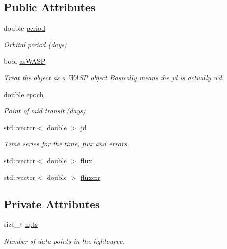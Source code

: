 \subsection*{Public Attributes}
\begin{DoxyCompactItemize}
\item 
double \hyperlink{classLightcurve_a6e8ac482decf1bbcc3f4eea9a4818646}{period}
\begin{DoxyCompactList}\small\item\em Orbital period (days) \item\end{DoxyCompactList}\item 
bool \hyperlink{classLightcurve_a54903f9ec0b5fc7b8080cacc332752ec}{asWASP}
\begin{DoxyCompactList}\small\item\em Treat the object as a WASP object Basically means the jd is actually wd. \item\end{DoxyCompactList}\item 
double \hyperlink{classLightcurve_aeb03d82f5ff13e75bbb40af674f6597a}{epoch}
\begin{DoxyCompactList}\small\item\em Point of mid transit (days) \item\end{DoxyCompactList}\item 
std::vector$<$ double $>$ \hyperlink{classLightcurve_a5bc412c5176599f90b4ae2fba5bd5f19}{jd}
\begin{DoxyCompactList}\small\item\em Time series for the time, flux and errors. \item\end{DoxyCompactList}\item 
std::vector$<$ double $>$ \hyperlink{classLightcurve_a88801eb8e66a51a2e15fad1aa42f7129}{flux}
\item 
std::vector$<$ double $>$ \hyperlink{classLightcurve_a4ef0c30138238483fe6a5573ed8838a7}{fluxerr}
\end{DoxyCompactItemize}
\subsection*{Private Attributes}
\begin{DoxyCompactItemize}
\item 
size\_\-t \hyperlink{classLightcurve_adf57f279eab9cb38a65ba09384dbf3f6}{npts}
\begin{DoxyCompactList}\small\item\em Number of data points in the lightcurve. \item\end{DoxyCompactList}\end{DoxyCompactItemize}


